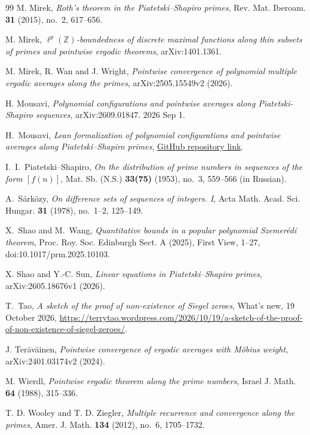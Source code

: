 \documentclass[12pt]{amsart}
\newcommand{\1}{\mathbf 1}
\begin{document}
\begin{thebibliography}{99}
M. Mirek,
\emph{Roth's theorem in the Piatetski--Shapiro primes},
Rev. Mat. Iberoam. \textbf{31} (2015), no.~2, 617--656.

M. Mirek,
\emph{$\ell^p(\mathbb Z)$-boundedness of discrete maximal functions
along thin subsets of primes and pointwise ergodic theorems},
arXiv:1401.1361.

M. Mirek, R. Wan and J. Wright,
\emph{Pointwise convergence of polynomial multiple ergodic averages along
the primes},
arXiv:2505.15549v2 (2026).



 H. Mousavi, \emph{Polynomial configurations and pointwise averages along Piatetski-Shapiro sequences}, arXiv:2609.01847. 2026 Sep 1.

H.~Mousavi,
\emph{Lean formalization of polynomial configurations and pointwise
averages along Piatetski--Shapiro primes},
\href{https://github.com/HamedMousaviMath/Lean-Formalization-Polynomial-Configurations-and-Pointwise-Averages-Along-Piatetski--Shapiro-Primes}{GitHub repository link}.

I.~I.~Piatetski--Shapiro,
\emph{On the distribution of prime numbers in sequences of
the form $[f(n)]$},
Mat. Sb. (N.S.) \textbf{33(75)} (1953), no.~3, 559--566
(in Russian).




A.~S\'ark\"ozy,
\emph{On difference sets of sequences of integers. I},
Acta Math. Acad. Sci. Hungar. \textbf{31} (1978),
no.~1--2, 125--149.

X.~Shao and M.~Wang,
\emph{Quantitative bounds in a popular polynomial Szemer\'edi theorem},
Proc. Roy. Soc. Edinburgh Sect. A (2025), First View, 1--27,
doi:10.1017/prm.2025.10103.

X. Shao and Y.-C. Sun,
\emph{Linear equations in Piatetski--Shapiro primes},
arXiv:2605.18676v1 (2026).


T.~Tao,
\emph{A sketch of the proof of non-existence of Siegel zeroes},
What's new, 19 October 2026,
\url{https://terrytao.wordpress.com/2026/10/19/a-sketch-of-the-proof-of-non-existence-of-siegel-zeroes/}.

J. Ter\"av\"ainen,
\emph{Pointwise convergence of ergodic averages with M\"obius weight},
arXiv:2401.03174v2 (2024).

M. Wierdl,
\emph{Pointwise ergodic theorem along the prime numbers},
Israel J. Math. \textbf{64} (1988), 315--336.

T. D. Wooley and T. D. Ziegler,
\emph{Multiple recurrence and convergence along the primes},
Amer. J. Math. \textbf{134} (2012), no.~6, 1705--1732.






\end{thebibliography}
\end{document}
